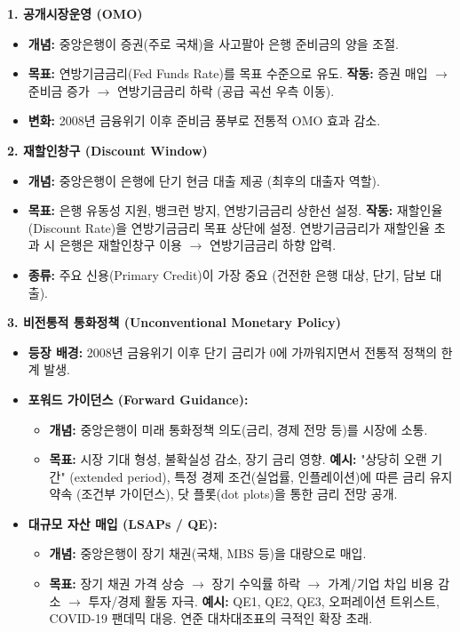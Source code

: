 \documentclass[11pt,a4paper]{book}
\theoremstyle{definition}
\begin{document}
\begin{tcolorbox}[summarybox, title={\textbf{중앙은행 통화정책 도구 요약}}]
  \textbf{1. 공개시장운영 (OMO)}
  \begin{itemize}
    \item \textbf{개념:} 중앙은행이 증권(주로 국채)을 사고팔아 은행 준비금의 양을 조절.
    \item \textbf{목표:} 연방기금금리(Fed Funds Rate)를 목표 수준으로 유도.
    \textbf{작동:} 증권 매입 $\rightarrow$ 준비금 증가 $\rightarrow$ 연방기금금리 하락 (공급 곡선 우측 이동).
    \item \textbf{변화:} 2008년 금융위기 이후 준비금 풍부로 전통적 OMO 효과 감소.
  \end{itemize}

  \textbf{2. 재할인창구 (Discount Window)}
  \begin{itemize}
    \item \textbf{개념:} 중앙은행이 은행에 단기 현금 대출 제공 (최후의 대출자 역할).
    \item \textbf{목표:} 은행 유동성 지원, 뱅크런 방지, 연방기금금리 상한선 설정.
    \textbf{작동:} 재할인율(Discount Rate)을 연방기금금리 목표 상단에 설정. 연방기금금리가 재할인율 초과 시 은행은 재할인창구 이용 $\rightarrow$ 연방기금금리 하향 압력.
    \item \textbf{종류:} 주요 신용(Primary Credit)이 가장 중요 (건전한 은행 대상, 단기, 담보 대출).
  \end{itemize}

  \textbf{3. 비전통적 통화정책 (Unconventional Monetary Policy)}
  \begin{itemize}
    \item \textbf{등장 배경:} 2008년 금융위기 이후 단기 금리가 0에 가까워지면서 전통적 정책의 한계 발생.
    \item \textbf{포워드 가이던스 (Forward Guidance):}
      \begin{itemize}
        \item \textbf{개념:} 중앙은행이 미래 통화정책 의도(금리, 경제 전망 등)를 시장에 소통.
        \item \textbf{목표:} 시장 기대 형성, 불확실성 감소, 장기 금리 영향.
        \textbf{예시:} "상당히 오랜 기간" (extended period), 특정 경제 조건(실업률, 인플레이션)에 따른 금리 유지 약속 (조건부 가이던스), 닷 플롯(dot plots)을 통한 금리 전망 공개.
      \end{itemize}
    \item \textbf{대규모 자산 매입 (LSAPs / QE):}
      \begin{itemize}
        \item \textbf{개념:} 중앙은행이 장기 채권(국채, MBS 등)을 대량으로 매입.
        \item \textbf{목표:} 장기 채권 가격 상승 $\rightarrow$ 장기 수익률 하락 $\rightarrow$ 가계/기업 차입 비용 감소 $\rightarrow$ 투자/경제 활동 자극.
        \textbf{예시:} QE1, QE2, QE3, 오퍼레이션 트위스트, COVID-19 팬데믹 대응. 연준 대차대조표의 극적인 확장 초래.
      \end{itemize}
  \end{itemize}


\end{tcolorbox}
\end{document}
